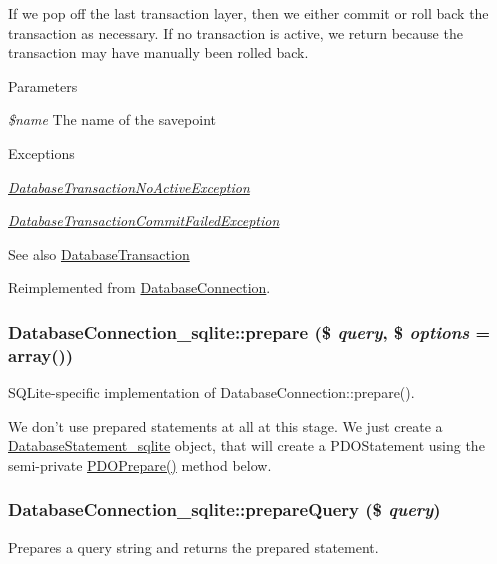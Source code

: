 If we pop off the last transaction layer, then we either commit or roll back the transaction as necessary. If no transaction is active, we return because the transaction may have manually been rolled back.


\begin{DoxyParams}{Parameters}
\item[{\em \$name}]The name of the savepoint\end{DoxyParams}

\begin{DoxyExceptions}{Exceptions}
\item[{\em \hyperlink{classDatabaseTransactionNoActiveException}{DatabaseTransactionNoActiveException}}]\item[{\em \hyperlink{classDatabaseTransactionCommitFailedException}{DatabaseTransactionCommitFailedException}}]\end{DoxyExceptions}
\begin{DoxySeeAlso}{See also}
\hyperlink{classDatabaseTransaction}{DatabaseTransaction} 
\end{DoxySeeAlso}


Reimplemented from \hyperlink{classDatabaseConnection_a0bca5087efb85e6480b953cc76ccfcb1}{DatabaseConnection}.\hypertarget{classDatabaseConnection__sqlite_ab5d9ea6a6930649133f401149b18fa65}{
\subsubsection[{prepare}]{\setlength{\rightskip}{0pt plus 5cm}DatabaseConnection\_\-sqlite::prepare (\$ {\em query}, \/  \$ {\em options} = {\ttfamily array()})}}
\label{classDatabaseConnection__sqlite_ab5d9ea6a6930649133f401149b18fa65}
SQLite-\/specific implementation of DatabaseConnection::prepare().

We don't use prepared statements at all at this stage. We just create a \hyperlink{classDatabaseStatement__sqlite}{DatabaseStatement\_\-sqlite} object, that will create a PDOStatement using the semi-\/private \hyperlink{classDatabaseConnection__sqlite_a8e377488ebb6c76e61590ca3f5d7245c}{PDOPrepare()} method below. \hypertarget{classDatabaseConnection__sqlite_aac5845cb92d937ec15f435043d014a8e}{
\subsubsection[{prepareQuery}]{\setlength{\rightskip}{0pt plus 5cm}DatabaseConnection\_\-sqlite::prepareQuery (\$ {\em query})}}
\label{classDatabaseConnection__sqlite_aac5845cb92d937ec15f435043d014a8e}
Prepares a query string and returns the prepared statement.

